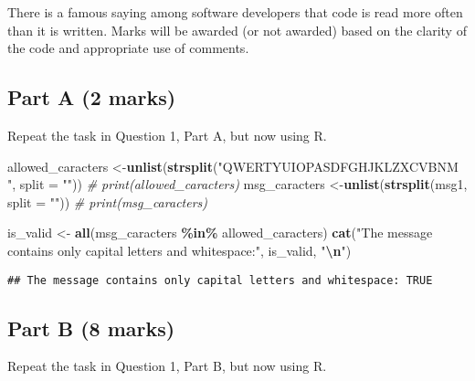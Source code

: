\documentclass[
]{article}
\newenvironment{Shaded}{\begin{snugshade}}{\end{snugshade}}
\newcommand{\AttributeTok}[1]{\textcolor[rgb]{0.13,0.29,0.53}{#1}}
\newcommand{\CommentTok}[1]{\textcolor[rgb]{0.56,0.35,0.01}{\textit{#1}}}
\newcommand{\FunctionTok}[1]{\textcolor[rgb]{0.13,0.29,0.53}{\textbf{#1}}}
\newcommand{\NormalTok}[1]{#1}
\newcommand{\OtherTok}[1]{\textcolor[rgb]{0.56,0.35,0.01}{#1}}
\newcommand{\SpecialCharTok}[1]{\textcolor[rgb]{0.81,0.36,0.00}{\textbf{#1}}}
\newcommand{\StringTok}[1]{\textcolor[rgb]{0.31,0.60,0.02}{#1}}
\begin{document}
There is a famous saying among software developers that code is read
more often than it is written. Marks will be awarded (or not awarded)
based on the clarity of the code and appropriate use of comments.

\subsection{Part A (2 marks)}\label{part-a-2-marks}

Repeat the task in Question 1, Part A, but now using R.

\begin{Shaded}
\begin{Highlighting}[]
\NormalTok{allowed\_caracters }\OtherTok{\textless{}{-}}\FunctionTok{unlist}\NormalTok{(}\FunctionTok{strsplit}\NormalTok{(}\StringTok{"QWERTYUIOPASDFGHJKLZXCVBNM "}\NormalTok{, }\AttributeTok{split =} \StringTok{""}\NormalTok{))}
\CommentTok{\# print(allowed\_caracters)}
\NormalTok{msg\_caracters }\OtherTok{\textless{}{-}}\FunctionTok{unlist}\NormalTok{(}\FunctionTok{strsplit}\NormalTok{(msg1, }\AttributeTok{split =} \StringTok{""}\NormalTok{))}
\CommentTok{\# print(msg\_caracters)}

\NormalTok{is\_valid }\OtherTok{\textless{}{-}} \FunctionTok{all}\NormalTok{(msg\_caracters }\SpecialCharTok{\%in\%}\NormalTok{ allowed\_caracters)}
\FunctionTok{cat}\NormalTok{(}\StringTok{"The message contains only capital letters and whitespace:"}\NormalTok{, is\_valid, }\StringTok{"}\SpecialCharTok{\textbackslash{}n}\StringTok{"}\NormalTok{)}
\end{Highlighting}
\end{Shaded}

\begin{verbatim}
## The message contains only capital letters and whitespace: TRUE
\end{verbatim}

\subsection{Part B (8 marks)}\label{part-b-8-marks}

Repeat the task in Question 1, Part B, but now using R.
\end{document}
